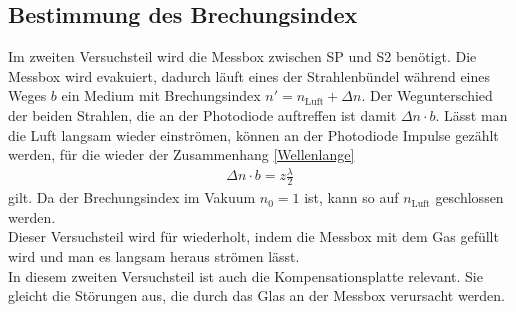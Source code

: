 \subsection*{Bestimmung des Brechungsindex}
Im zweiten Versuchsteil wird die Messbox zwischen SP und S2 benötigt. Die Messbox wird evakuiert, dadurch läuft eines der Strahlenbündel während eines Weges $b$ ein Medium mit Brechungsindex $n' = n_\text{Luft} + \Delta n$. Der Wegunterschied der beiden Strahlen, die an der Photodiode auftreffen ist damit $\Delta n\cdot b$. Lässt man die Luft langsam wieder einströmen, können an der Photodiode Impulse gezählt werden, für die wieder der Zusammenhang \eqref{Wellenlange}
\begin{align}\label{brechungsindex1}
	\Delta n\cdot b = z \frac{\lambda}{2}
\end{align}
gilt. Da der Brechungsindex im Vakuum $n_0=1$ ist, kann so auf $n_\text{Luft}$ geschlossen werden. \\
Dieser Versuchsteil wird für  wiederholt, indem die Messbox mit dem Gas gefüllt wird und man es langsam heraus strömen lässt. \\
In diesem zweiten Versuchsteil ist auch die Kompensationsplatte relevant. Sie gleicht die Störungen aus, die durch das Glas an der Messbox verursacht werden.
